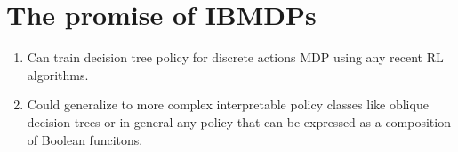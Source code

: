 \section{The promise of IBMDPs}
\begin{enumerate}
    \item Can train decision tree policy for discrete actions MDP using any recent RL algorithms.
    \item Could generalize to more complex interpretable policy classes like oblique decision trees or in general any policy that can be expressed as a composition of Boolean funcitons.
\end{enumerate}


